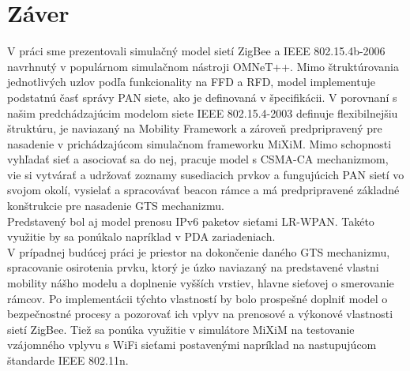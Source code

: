 \chapter{Záver}
\indent\indent V práci sme prezentovali simulačný model sietí ZigBee a IEEE 802.15.4b-2006 navrhnutý v populárnom simulačnom nástroji OMNeT++. Mimo štruktúrovania jednotlivých uzlov podľa funkcionality na FFD a RFD, model implementuje podstatnú časť správy PAN siete, ako je definovaná v špecifikácii. V porovnaní s našim predchádzajúcim modelom siete IEEE 802.15.4-2003 definuje flexibilnejšiu štruktúru, je naviazaný na Mobility Framework a zároveň predpripravený pre nasadenie v prichádzajúcom simulačnom frameworku MiXiM. Mimo schopnosti vyhľadať sieť a asociovať sa do nej, pracuje model s CSMA-CA mechanizmom, vie si vytvárať a udržovať zoznamy susediacich prvkov a fungujúcich PAN sietí vo svojom okolí, vysielať a spracovávať beacon rámce a má predpripravené základné konštrukcie pre nasadenie GTS mechanizmu.\\
\indent Predstavený bol aj model prenosu IPv6 paketov sieťami LR-WPAN. Takéto využitie by sa ponúkalo napríklad v PDA zariadeniach.\\
\indent V prípadnej budúcej práci je priestor na dokončenie daného GTS mechanizmu, spracovanie osirotenia prvku, ktorý je úzko naviazaný na predstavené vlastni mobility nášho modelu a doplnenie vyšších vrstiev, hlavne sieťovej o smerovanie rámcov. Po implementácii týchto vlastností by bolo prospešné doplniť model o bezpečnostné procesy a pozorovať ich vplyv na prenosové a výkonové vlastnosti sietí ZigBee. Tiež sa ponúka využitie v simulátore MiXiM na testovanie vzájomného vplyvu s WiFi sieťami postavenými napríklad na nastupujúcom štandarde IEEE 802.11n.\\